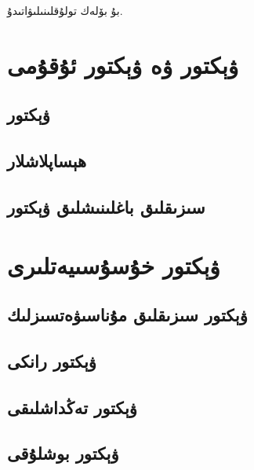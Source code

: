 بۇ بۆلەك تولۇقلىنىلىۋاتىدۇ.

\section{ۋېكتور ۋە ۋېكتور ئۇقۇمى}
\subsection{ۋېكتور}
\subsection{ھېساپلاشلار}
\subsection{سىزىقلىق باغلىنىشلىق ۋېكتور}

\section{ۋېكتور خۇسۇسىيەتلىرى}
\subsection{ۋېكتور سىزىقلىق مۇناسىۋەتسىزلىك}
\subsection{ۋېكتور رانكى}
\subsection{ۋېكتور تەڭداشلىقى}
\subsection{ۋېكتور بوشلۇقى}
